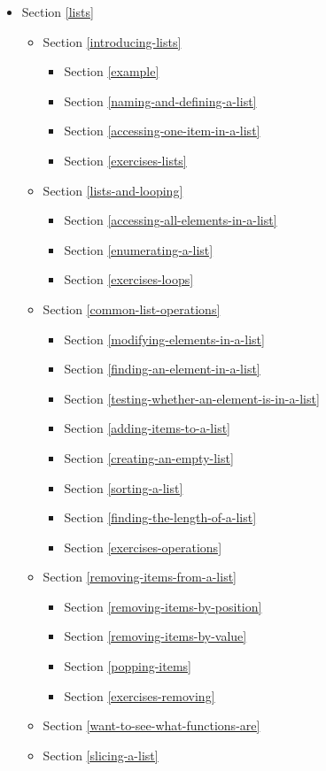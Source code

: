 \documentclass[11pt]{article}
\providecommand{\tightlist}{%
      \setlength{\itemsep}{0pt}\setlength{\parskip}{0pt}}
\begin{document}
\begin{itemize}
\tightlist
\item
  Section \ref{lists}

  \begin{itemize}
  \tightlist
  \item
    Section \ref{introducing-lists}

    \begin{itemize}
    \tightlist
    \item
      Section \ref{example}
    \item
      Section \ref{naming-and-defining-a-list}
    \item
      Section \ref{accessing-one-item-in-a-list}
    \item
      Section \ref{exercises-lists}
    \end{itemize}
  \item
    Section \ref{lists-and-looping}

    \begin{itemize}
    \tightlist
    \item
      Section \ref{accessing-all-elements-in-a-list}
    \item
      Section \ref{enumerating-a-list}
    \item
      Section \ref{exercises-loops}
    \end{itemize}
  \item
    Section \ref{common-list-operations}

    \begin{itemize}
    \tightlist
    \item
      Section \ref{modifying-elements-in-a-list}
    \item
      Section \ref{finding-an-element-in-a-list}
    \item
      Section \ref{testing-whether-an-element-is-in-a-list}
    \item
      Section \ref{adding-items-to-a-list}
    \item
      Section \ref{creating-an-empty-list}
    \item
      Section \ref{sorting-a-list}
    \item
      Section \ref{finding-the-length-of-a-list}
    \item
      Section \ref{exercises-operations}
    \end{itemize}
  \item
    Section \ref{removing-items-from-a-list}

    \begin{itemize}
    \tightlist
    \item
      Section \ref{removing-items-by-position}
    \item
      Section \ref{removing-items-by-value}
    \item
      Section \ref{popping-items}
    \item
      Section \ref{exercises-removing}
    \end{itemize}
  \item
    Section \ref{want-to-see-what-functions-are}
  \item
    Section \ref{slicing-a-list}


\end{itemize}
\end{itemize}
\end{document}
